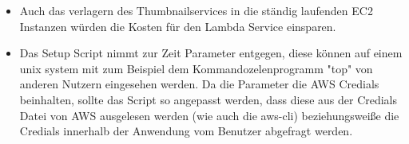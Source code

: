 \documentclass[a4paper, 12pt]{scrreprt}
\renewcommand\_{\textunderscore\allowbreak}
\begin{document}
\begin{itemize}
\item Auch das verlagern des Thumbnailservices in die ständig laufenden EC2 Instanzen würden die Kosten für den Lambda Service einsparen.
\item Das Setup Script nimmt zur Zeit Parameter entgegen, diese können auf einem unix system mit zum Beispiel dem Kommandozelenprogramm "top" von anderen Nutzern eingesehen werden. Da die Parameter die AWS Credials beinhalten, sollte das Script so angepasst werden, dass diese aus der Credials Datei von AWS ausgelesen werden (wie auch die aws-cli) beziehungsweiße die Credials innerhalb der Anwendung vom Benutzer abgefragt werden.
\end{itemize}


\clearpage


%
\end{document}
